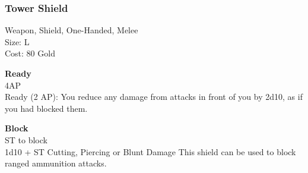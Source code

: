\subsubsection{Tower Shield}\label{weapon:towerShield}
Weapon, Shield, One-Handed, Melee\\
Size: L\\
Cost: 80 Gold

\textbf{Ready}\\
4AP\\
Ready (2 AP): You reduce any damage from attacks in front of you by 2d10, as if you had blocked them.

\textbf{Block}\\
ST to block\\
1d10 + \texttimes ST Cutting, Piercing or Blunt Damage
This shield can be used to block ranged ammunition attacks.\\